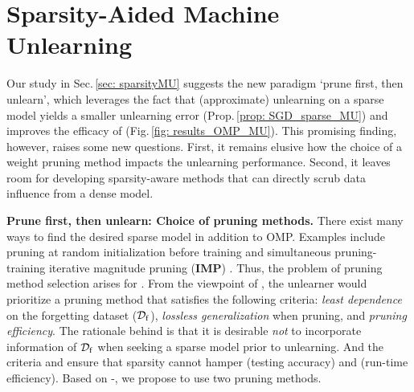 
\section{Sparsity-Aided Machine Unlearning}
\label{sec: sparsity_MU_alg}



Our study in Sec.\,\ref{sec: sparsityMU} suggests the new  {\MU} paradigm `prune first, then unlearn', which leverages the fact that  (approximate) unlearning on a sparse model yields a smaller unlearning error (Prop.\,\ref{prop: SGD_sparse_MU}) and improves the efficacy of {\MU}   (Fig.\,\ref{fig: results_OMP_MU}).
This promising finding, however, raises some new questions.  First, it remains elusive how the choice of a weight pruning method impacts the unlearning performance. Second,
it leaves room for developing  {sparsity-aware} {\MU} methods that can directly scrub data influence from a dense model.  %
 



\noindent \textbf{Prune first, then unlearn: Choice of pruning methods.}
  There exist many ways to find the desired sparse model
in addition to OMP. Examples include pruning at random
initialization before training \cite{tanaka2020pruning,frankle2020pruning}
 and simultaneous pruning-training iterative magnitude pruning (\textbf{IMP}) \cite{frankle2018lottery}.
  Thus, the problem of pruning method selection arises for {\MU}. From the viewpoint of {\MU},  the unlearner would prioritize a pruning method that satisfies the following criteria:   \textit{least dependence}  on the forgetting dataset ($\mathcal D_\mathrm{f}$),  \textit{lossless generalization} when pruning, and  \textit{pruning efficiency}. The rationale behind  is  that  
  it is desirable \textit{not} to incorporate    information of $\mathcal D_\mathrm{f}$ when seeking a sparse model prior to unlearning. 
  And the criteria  and  ensure that sparsity cannot hamper {\TA} (testing accuracy)  and {\RTE} (run-time efficiency). 
  Based on -, 
  we   propose to use two pruning methods.  

